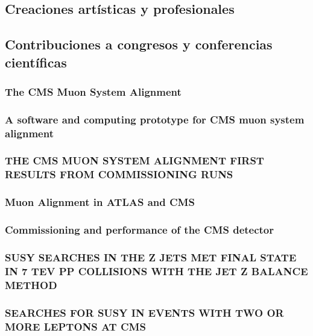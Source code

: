 \documentclass[a4paper, 11pt, twoside, openright]{report}
\begin{document}
\subsection{Creaciones artísticas y profesionales}

\subsection{Contribuciones a congresos y conferencias científicas}

\subsubsection{The CMS Muon System Alignment}

\subsubsection{A software and computing prototype for CMS muon system alignment}

\subsubsection{THE CMS MUON SYSTEM ALIGNMENT FIRST RESULTS FROM COMMISSIONING RUNS}

\subsubsection{Muon Alignment in ATLAS and CMS}

\subsubsection{Commissioning and performance of the CMS detector}

\subsubsection{SUSY SEARCHES IN THE Z JETS MET FINAL STATE IN 7 TEV PP COLLISIONS WITH THE JET Z BALANCE METHOD}

\subsubsection{SEARCHES FOR SUSY IN EVENTS WITH TWO OR MORE LEPTONS AT CMS}

\end{document}
